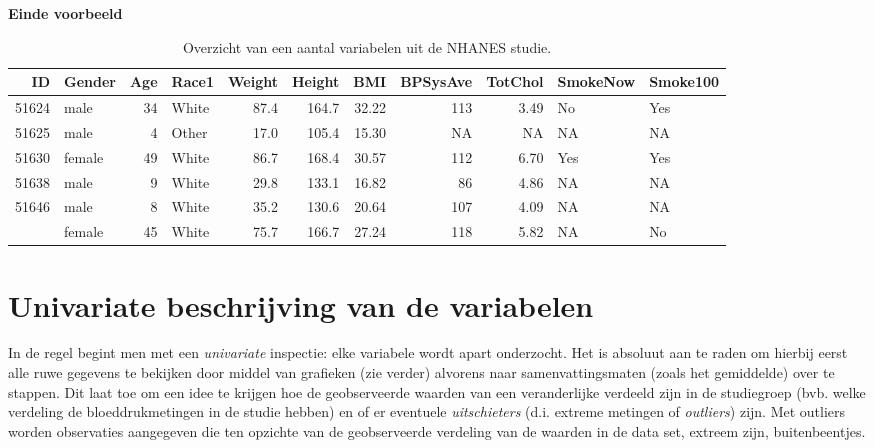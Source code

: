 \documentclass[
  12pt,dutch,coursenotes]{book}
\theoremstyle{definition}
\theoremstyle{definition}
\theoremstyle{definition}
\theoremstyle{remark}
\begin{document}
\textbf{Einde voorbeeld}

\begin{table}

\caption{\label{tab:nhanesDatExpl}Overzicht van een aantal variabelen uit de NHANES studie.}
\centering
\begin{tabular}[t]{rlrlrrrrrll}
\toprule
ID & Gender & Age & Race1 & Weight & Height & BMI & BPSysAve & TotChol & SmokeNow & Smoke100\\
\midrule
51624 & male & 34 & White & 87.4 & 164.7 & 32.22 & 113 & 3.49 & No & Yes\\
51625 & male & 4 & Other & 17.0 & 105.4 & 15.30 & NA & NA & NA & NA\\
51630 & female & 49 & White & 86.7 & 168.4 & 30.57 & 112 & 6.70 & Yes & Yes\\
51638 & male & 9 & White & 29.8 & 133.1 & 16.82 & 86 & 4.86 & NA & NA\\
51646 & male & 8 & White & 35.2 & 130.6 & 20.64 & 107 & 4.09 & NA & NA\\
\addlinespace
51647 & female & 45 & White & 75.7 & 166.7 & 27.24 & 118 & 5.82 & NA & No\\
\bottomrule
\end{tabular}
\end{table}

\hypertarget{sec:univar}{%
\section{Univariate beschrijving van de variabelen}\label{sec:univar}}

In de regel begint men met een \emph{univariate} inspectie: elke variabele
wordt apart onderzocht. Het is absoluut aan te raden om hierbij eerst alle
ruwe gegevens te bekijken door middel van grafieken (zie verder) alvorens
naar samenvattingsmaten (zoals het gemiddelde) over te stappen. Dit laat toe
om een idee te krijgen hoe de geobserveerde waarden van een veranderlijke
verdeeld zijn in de studiegroep (bvb. welke verdeling de bloeddrukmetingen in de studie hebben)
en of er eventuele \emph{uitschieters} (d.i. extreme
metingen of \emph{outliers}) zijn. Met outliers worden observaties
aangegeven die ten opzichte van de geobserveerde verdeling van de waarden in
de data set, extreem zijn, buitenbeentjes.
\end{document}
